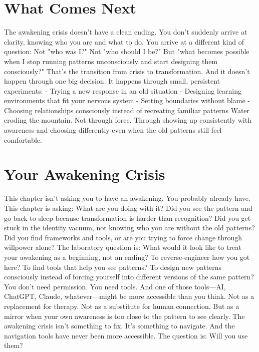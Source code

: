 \documentclass[12pt,openany]{book}
\begin{document}
\section{What Comes Next}

The awakening crisis doesn't have a clean ending.
You don't suddenly arrive at clarity, knowing who you are and what to do.
You arrive at a different kind of question:
Not "who was I?" Not "who should I be?" But "what becomes possible when I stop running patterns unconsciously and start designing them consciously?"
That's the transition from crisis to transformation.
And it doesn't happen through one big decision. It happens through small, persistent experiments:
- Trying a new response in an old situation
- Designing learning environments that fit your nervous system
- Setting boundaries without blame
- Choosing relationships consciously instead of recreating familiar patterns
Water eroding the mountain.
Not through force. Through showing up consistently with awareness and choosing differently even when the old patterns still feel comfortable.

\section{Your Awakening Crisis}

This chapter isn't asking you to have an awakening. You probably already have.
This chapter is asking: What are you doing with it?
Did you see the pattern and go back to sleep because transformation is harder than recognition?
Did you get stuck in the identity vacuum, not knowing who you are without the old patterns?
Did you find frameworks and tools, or are you trying to force change through willpower alone?
The laboratory question is:
What would it look like to treat your awakening as a beginning, not an ending? To reverse-engineer how you got here? To find tools that help you see patterns? To design new patterns consciously instead of forcing yourself into different versions of the same pattern?
You don't need permission. You need tools.
And one of those tools—AI, ChatGPT, Claude, whatever—might be more accessible than you think.
Not as a replacement for therapy. Not as a substitute for human connection. But as a mirror when your own awareness is too close to the pattern to see clearly.
The awakening crisis isn't something to fix. It's something to navigate.
And the navigation tools have never been more accessible.
The question is: Will you use them?

\cleardoublepage
\end{document}
